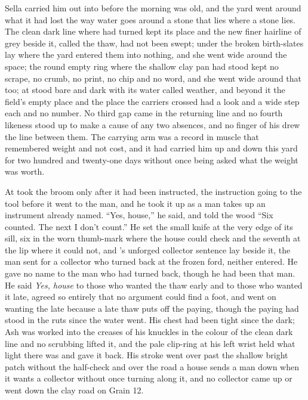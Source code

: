Sella carried him out into  before the morning was old, and the yard went around what it had lost the way water goes around a stone that lies where a stone lies. The clean dark line where  had turned kept its place and the new finer hairline of grey beside it, called the thaw, had not been swept; under  the broken birth-slates lay where the yard entered them into nothing, and she went wide around the space; the round empty ring where the shallow clay pan had stood kept no scrape, no crumb, no print, no chip and no word, and she went wide around that too; at   stood bare and dark with its water called weather, and beyond it the field's empty place and the place the carriers crossed had a look and a wide step each and no number. No third gap came in the returning line and no fourth likeness stood up to make a cause of any two absences, and no finger of his drew the line between them. The carrying arm was a record in muscle that remembered weight and not cost, and it had carried him up and down this yard for two hundred and twenty-one days without once being asked what the weight was worth.

\scenebreak

At   took the broom only after it had been instructed, the instruction going to the tool before it went to the man, and he took it up as a man takes up an instrument already named. “Yes, house,” he said, and told the wood “Six counted. The next I don't count.” He set the small knife at the very edge of its sill, six in the worn thumb-mark where the house could check and the seventh at the lip where it could not, and 's unforged collector sentence lay beside it, the man sent for a collector who turned back at the frozen ford, neither entered. He gave no name to the man who had turned back, though he had been that man. He said \emph{Yes, house} to those who wanted the thaw early and to those who wanted it late, agreed so entirely that no argument could find a foot, and went on wanting the late because a late thaw puts off the paying, though the paying had stood in the ruts since the water went. His chest had been tight since the dark; Ash was worked into the creases of his knuckles in the colour of the clean dark line and no scrubbing lifted it, and the pale clip-ring at his left wrist held what light there was and gave it back. His stroke went over  past the shallow bright patch without the half-check and over the road a house sends a man down when it wants a collector without once turning along it, and no collector came up or went down the clay road on Grain 12.

